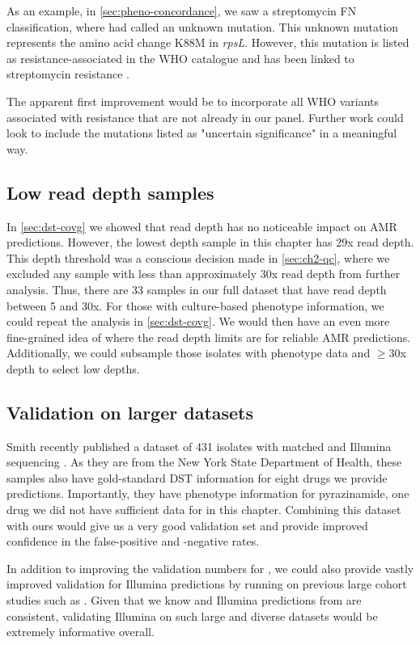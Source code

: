 As an example, in \autoref{sec:pheno-concordance}, we saw a streptomycin FN classification, where \drprg{} had called an unknown mutation. This unknown mutation represents the amino acid change K88M in \textit{rpsL}. However, this mutation is listed as resistance-associated in the WHO catalogue and has been linked to streptomycin resistance \cite{Smittipat2016}.

The apparent first improvement would be to incorporate all WHO variants associated with resistance that are not already in our panel. Further work could look to include the mutations listed as "uncertain significance" in a meaningful way.

\subsection{Low read depth samples}

In \autoref{sec:dst-covg} we showed that read depth has no noticeable impact on AMR predictions. However, the lowest depth sample in this chapter has 29x read depth. This depth threshold was a conscious decision made in \autoref{sec:ch2-qc}, where we excluded any sample with less than approximately 30x read depth from further analysis. Thus, there are 33 samples in our full dataset that have \ont{} read depth between 5 and 30x. For those with culture-based phenotype information, we could repeat the analysis in \autoref{sec:dst-covg}. We would then have an even more fine-grained idea of where the \ont{} read depth limits are for reliable AMR predictions. Additionally, we could subsample those isolates with phenotype data and $\ge30$x depth to select low depths. 

\subsection{Validation on larger datasets}

Smith \etal{} recently published a dataset of 431 \mtb{} isolates with matched \ont{} and Illumina sequencing \cite{smith2020}. As they are from the New York State Department of Health, these samples also have gold-standard DST information for eight drugs we provide predictions. Importantly, they have phenotype information for pyrazinamide, one drug we did not have sufficient data for in this chapter. Combining this dataset with ours would give us a very good \ont{} validation set and provide improved confidence in the false-positive and -negative rates. 

In addition to improving the validation numbers for \ont{}, we could also provide vastly improved validation for \drprg{} Illumina predictions by running on previous large cohort studies such as \cite{cryptic2018,hunt2019,phelan2019}. Given that we know \ont{} and Illumina predictions from \drprg{} are consistent, validating Illumina on such large and diverse datasets would be extremely informative overall.

